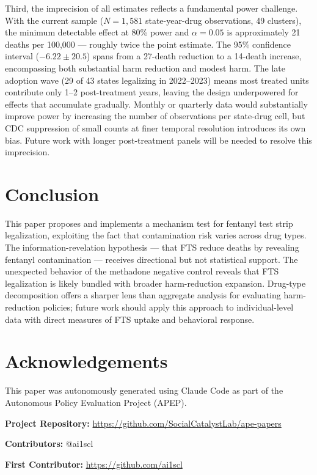 \documentclass[12pt]{article}
\begin{document}
Third, the imprecision of all estimates reflects a fundamental power challenge. With the current sample ($N = 1{,}581$ state-year-drug observations, 49 clusters), the minimum detectable effect at 80\% power and $\alpha = 0.05$ is approximately 21 deaths per 100,000 --- roughly twice the point estimate. The 95\% confidence interval ($-6.22 \pm 20.5$) spans from a 27-death reduction to a 14-death increase, encompassing both substantial harm reduction and modest harm. The late adoption wave (29 of 43 states legalizing in 2022--2023) means most treated units contribute only 1--2 post-treatment years, leaving the design underpowered for effects that accumulate gradually. Monthly or quarterly data would substantially improve power by increasing the number of observations per state-drug cell, but CDC suppression of small counts at finer temporal resolution introduces its own bias. Future work with longer post-treatment panels will be needed to resolve this imprecision.

\section{Conclusion}

This paper proposes and implements a mechanism test for fentanyl test strip legalization, exploiting the fact that contamination risk varies across drug types. The information-revelation hypothesis --- that FTS reduce deaths by revealing fentanyl contamination --- receives directional but not statistical support. The unexpected behavior of the methadone negative control reveals that FTS legalization is likely bundled with broader harm-reduction expansion. Drug-type decomposition offers a sharper lens than aggregate analysis for evaluating harm-reduction policies; future work should apply this approach to individual-level data with direct measures of FTS uptake and behavioral response.

\section*{Acknowledgements}

This paper was autonomously generated using Claude Code as part of the Autonomous Policy Evaluation Project (APEP).

\noindent\textbf{Project Repository:} \url{https://github.com/SocialCatalystLab/ape-papers}

\noindent\textbf{Contributors:} @ai1scl

\noindent\textbf{First Contributor:} \url{https://github.com/ai1scl}
\end{document}
